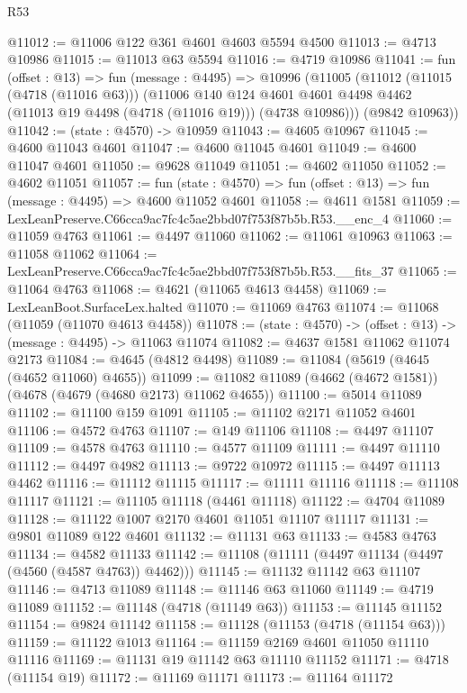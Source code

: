 \begin{lexlean}{R53}
\begin{coremodule}
@11012 := @11006 @122 @361 @4601 @4603 @5594 @4500
@11013 := @4713 @10986
@11015 := @11013 @63 @5594
@11016 := @4719 @10986
@11041 := fun (offset : @13) =>
  fun (message : @4495) =>
  @10996
    (@11005
      (@11012
        (@11015 (@4718 (@11016 @63)))
        (@11006
          @140
          @124
          @4601
          @4601
          @4498
          @4462
          (@11013 @19 @4498 (@4718 (@11016 @19)))
          (@4738 @10986)))
      (@9842 @10963))
@11042 := (state : @4570) -> @10959
@11043 := @4605 @10967
@11045 := @4600 @11043 @4601
@11047 := @4600 @11045 @4601
@11049 := @4600 @11047 @4601
@11050 := @9628 @11049
@11051 := @4602 @11050
@11052 := @4602 @11051
@11057 := fun (state : @4570) => fun (offset : @13) => fun (message : @4495) => @4600 @11052 @4601
@11058 := @4611 @1581
@11059 := LexLeanPreserve.C66cca9ac7fc4c5ae2bbd07f753f87b5b.R53.__enc_4
@11060 := @11059 @4763
@11061 := @4497 @11060
@11062 := @11061 @10963
@11063 := @11058 @11062
@11064 := LexLeanPreserve.C66cca9ac7fc4c5ae2bbd07f753f87b5b.R53.__fits_37
@11065 := @11064 @4763
@11068 := @4621 (@11065 @4613 @4458)
@11069 := LexLeanBoot.SurfaceLex.halted
@11070 := @11069 @4763
@11074 := @11068 (@11059 (@11070 @4613 @4458))
@11078 := (state : @4570) -> (offset : @13) -> (message : @4495) -> @11063 @11074
@11082 := @4637 @1581 @11062 @11074 @2173
@11084 := @4645 (@4812 @4498)
@11089 := @11084 (@5619 (@4645 (@4652 @11060) @4655))
@11099 := @11082 @11089 (@4662 (@4672 @1581)) (@4678 (@4679 (@4680 @2173) @11062 @4655))
@11100 := @5014 @11089
@11102 := @11100 @159 @1091
@11105 := @11102 @2171 @11052 @4601
@11106 := @4572 @4763
@11107 := @149 @11106
@11108 := @4497 @11107
@11109 := @4578 @4763
@11110 := @4577 @11109
@11111 := @4497 @11110
@11112 := @4497 @4982
@11113 := @9722 @10972
@11115 := @4497 @11113 @4462
@11116 := @11112 @11115
@11117 := @11111 @11116
@11118 := @11108 @11117
@11121 := @11105 @11118 (@4461 @11118)
@11122 := @4704 @11089
@11128 := @11122 @1007 @2170 @4601 @11051 @11107 @11117
@11131 := @9801 @11089 @122 @4601
@11132 := @11131 @63
@11133 := @4583 @4763
@11134 := @4582 @11133
@11142 := @11108 (@11111 (@4497 @11134 (@4497 (@4560 (@4587 @4763)) @4462)))
@11145 := @11132 @11142 @63 @11107
@11146 := @4713 @11089
@11148 := @11146 @63 @11060
@11149 := @4719 @11089
@11152 := @11148 (@4718 (@11149 @63))
@11153 := @11145 @11152
@11154 := @9824 @11142
@11158 := @11128 (@11153 (@4718 (@11154 @63)))
@11159 := @11122 @1013
@11164 := @11159 @2169 @4601 @11050 @11110 @11116
@11169 := @11131 @19 @11142 @63 @11110 @11152
@11171 := @4718 (@11154 @19)
@11172 := @11169 @11171
@11173 := @11164 @11172

\end{coremodule}
\end{lexlean}
